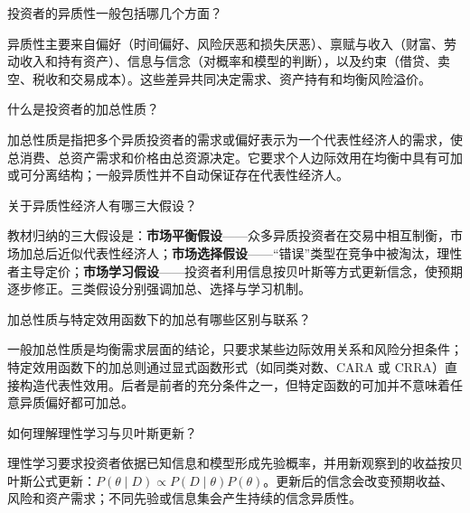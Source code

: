 
\begin{problem}
 投资者的异质性一般包括哪几个方面？
\end{problem}
\begin{solution}
异质性主要来自偏好（时间偏好、风险厌恶和损失厌恶）、禀赋与收入（财富、劳动收入和持有资产）、信息与信念（对概率和模型的判断），以及约束（借贷、卖空、税收和交易成本）。这些差异共同决定需求、资产持有和均衡风险溢价。
\end{solution}
\begin{problem}
 什么是投资者的加总性质？
\end{problem}
\begin{solution}
加总性质是指把多个异质投资者的需求或偏好表示为一个代表性经济人的需求，使总消费、总资产需求和价格由总资源决定。它要求个人边际效用在均衡中具有可加或可分离结构；一般异质性并不自动保证存在代表性经济人。
\end{solution}
\begin{problem}
 关于异质性经济人有哪三大假设？
\end{problem}
\begin{solution}
教材归纳的三大假设是：\textbf{市场平衡假设}——众多异质投资者在交易中相互制衡，市场加总后近似代表性经济人；\textbf{市场选择假设}——“错误”类型在竞争中被淘汰，理性者主导定价；\textbf{市场学习假设}——投资者利用信息按贝叶斯等方式更新信念，使预期逐步修正。三类假设分别强调加总、选择与学习机制。
\end{solution}
\begin{problem}
 加总性质与特定效用函数下的加总有哪些区别与联系？
\end{problem}
\begin{solution}
一般加总性质是均衡需求层面的结论，只要求某些边际效用关系和风险分担条件；特定效用函数下的加总则通过显式函数形式（如同类对数、CARA 或 CRRA）直接构造代表性效用。后者是前者的充分条件之一，但特定函数的可加并不意味着任意异质偏好都可加总。
\end{solution}
\begin{problem}
 如何理解理性学习与贝叶斯更新？
\end{problem}
\begin{solution}
理性学习要求投资者依据已知信息和模型形成先验概率，并用新观察到的收益按贝叶斯公式更新：$P(\theta\mid D)\propto P(D\mid\theta)P(\theta)$。更新后的信念会改变预期收益、风险和资产需求；不同先验或信息集会产生持续的信念异质性。
\end{solution}


